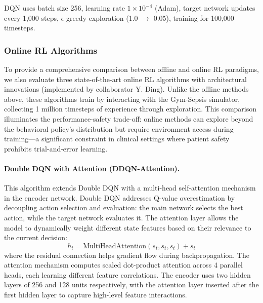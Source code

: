 DQN uses batch size 256, learning rate $1 \times 10^{-4}$ (Adam), target network updates every 1,000 steps, $\epsilon$-greedy exploration (1.0 $\to$ 0.05), training for 100,000 timesteps.

\subsubsection{Online RL Algorithms}\label{sec:methods:algos:online}

To provide a comprehensive comparison between offline and online RL paradigms, we also evaluate three state-of-the-art online RL algorithms with architectural innovations (implemented by collaborator Y. Ding). Unlike the offline methods above, these algorithms train by interacting with the Gym-Sepsis simulator, collecting 1 million timesteps of experience through exploration. This comparison illuminates the performance-safety trade-off: online methods can explore beyond the behavioral policy's distribution but require environment access during training—a significant constraint in clinical settings where patient safety prohibits trial-and-error learning.

\paragraph{Double DQN with Attention (DDQN-Attention).}
This algorithm extends Double DQN \citep{vanHasselt2016double_dqn} with a multi-head self-attention mechanism in the encoder network. Double DQN addresses Q-value overestimation by decoupling action selection and evaluation: the main network selects the best action, while the target network evaluates it. The attention layer allows the model to dynamically weight different state features based on their relevance to the current decision:
\begin{equation}
h_t = \text{MultiHeadAttention}(s_t, s_t, s_t) + s_t
\end{equation}
where the residual connection helps gradient flow during backpropagation. The attention mechanism computes scaled dot-product attention across 4 parallel heads, each learning different feature correlations. The encoder uses two hidden layers of 256 and 128 units respectively, with the attention layer inserted after the first hidden layer to capture high-level feature interactions.

